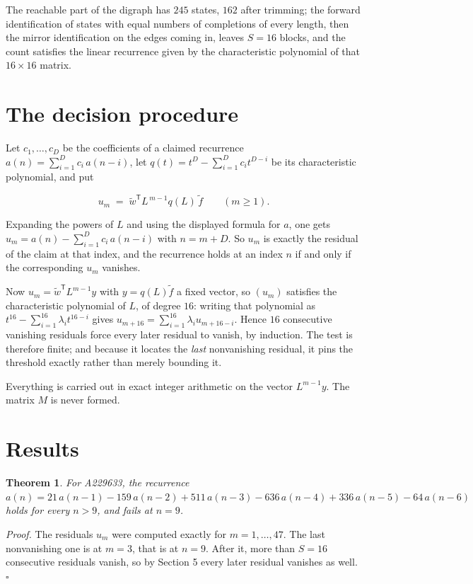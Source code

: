 \documentclass[11pt]{article}
\newtheorem{theorem}{Theorem}
\theoremstyle{definition}
\begin{document}
The reachable part of the digraph has $245$ states, $162$ after trimming; the forward identification of states with equal numbers of completions of every length, then the mirror identification on the edges coming in, leaves $S = 16$ blocks, and the count satisfies the linear recurrence given by the characteristic polynomial of that $16\times16$ matrix.

\section{The decision procedure}

Let $c_1,\dots,c_D$ be the coefficients of a claimed recurrence $a(n) = \sum_{i=1}^{D} c_i\,a(n-i)$, let $q(t) = t^{D} - \sum_{i=1}^{D} c_i t^{D-i}$ be its characteristic polynomial, and put

\[u_m \;=\; \tilde w^{\mathsf T} L^{\,m-1} q(L)\,\tilde f \qquad (m \ge 1).\]

Expanding the powers of $L$ and using the displayed formula for $a$, one gets $u_m = a(n) - \sum_{i=1}^{D} c_i\,a(n-i)$ with $n = m + D$. So $u_m$ is exactly the residual of the claim at that index, and the recurrence holds at an index $n$ if and only if the corresponding $u_m$ vanishes.

Now $u_m = \tilde w^{\mathsf T} L^{m-1} y$ with $y = q(L)\tilde f$ a fixed vector, so $(u_m)$ satisfies the characteristic polynomial of $L$, of degree $16$: writing that polynomial as $t^{16} - \sum_{i=1}^{16} \lambda_i t^{16-i}$ gives $u_{m+16} = \sum_{i=1}^{16} \lambda_i u_{m+16-i}$. Hence $16$ consecutive vanishing residuals force every later residual to vanish, by induction. The test is therefore finite; and because it locates the {\itshape last} nonvanishing residual, it pins the threshold exactly rather than merely bounding it.

Everything is carried out in exact integer arithmetic on the vector $L^{m-1}y$. The matrix $M$ is never formed.

\section{Results}

\begin{theorem} For A229633, the recurrence $a(n) = 21\,a(n-1) - 159\,a(n-2) + 511\,a(n-3) - 636\,a(n-4) + 336\,a(n-5) - 64\,a(n-6)$ holds for every $n > 9$, and fails at $n = 9$.\end{theorem}

{\itshape Proof.} The residuals $u_m$ were computed exactly for $m = 1,\dots,47$. The last nonvanishing one is at $m = 3$, that is at $n = 9$. After it, more than $S = 16$ consecutive residuals vanish, so by Section 5 every later residual vanishes as well. $\square$
\end{document}

